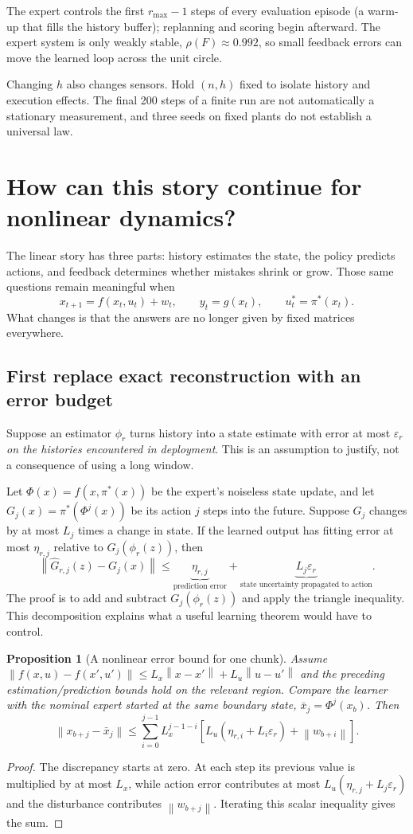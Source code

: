 \documentclass[12 pt]{article}        	%
\newtheorem{proposition}[theorem]{Proposition}
\theoremstyle{definition}
\newcommand{\norm}[1]{\left\|#1\right\|}
\begin{document}
The expert controls the first $r_{\max}-1$ steps of every evaluation episode (a warm-up that fills the history buffer); replanning and scoring begin afterward. The expert system is only weakly stable, $\rho(F)\approx0.992$, so small feedback errors can move the learned loop across the unit circle.

Changing $h$ also changes sensors. Hold $(n,h)$ fixed to isolate history and execution effects. The final 200 steps of a finite run are not automatically a stationary measurement, and three seeds on fixed plants do not establish a universal law.

\section{How can this story continue for nonlinear dynamics?}
The linear story has three parts: history estimates the state, the policy predicts actions, and feedback determines whether mistakes shrink or grow. Those same questions remain meaningful when
\[
x_{t+1}=f(x_t,u_t)+w_t,\qquad y_t=g(x_t),\qquad u_t^*=\pi^*(x_t).
\]
What changes is that the answers are no longer given by fixed matrices everywhere.

\subsection{First replace exact reconstruction with an error budget}
Suppose an estimator $\phi_r$ turns history into a state estimate with error at most $\varepsilon_r$ \emph{on the histories encountered in deployment}. This is an assumption to justify, not a consequence of using a long window.

Let $\Phi(x)=f(x,\pi^*(x))$ be the expert's noiseless state update, and let $G_j(x)=\pi^*(\Phi^j(x))$ be its action $j$ steps into the future. Suppose $G_j$ changes by at most $L_j$ times a change in state. If the learned output has fitting error at most $\eta_{r,j}$ relative to $G_j(\phi_r(z))$, then
\[
\norm{\widehat G_{r,j}(z)-G_j(x)}
\le \underbrace{\eta_{r,j}}_{\text{prediction error}}
+\underbrace{L_j\varepsilon_r}_{\text{state uncertainty propagated to action}}.
\]
The proof is to add and subtract $G_j(\phi_r(z))$ and apply the triangle inequality. This decomposition explains what a useful learning theorem would have to control.

\begin{proposition}[A nonlinear error bound for one chunk]
Assume $\norm{f(x,u)-f(x',u')}\le L_x\norm{x-x'}+L_u\norm{u-u'}$ and the preceding estimation/prediction bounds hold on the relevant region. Compare the learner with the nominal expert started at the same boundary state, $\bar x_j=\Phi^j(x_b)$. Then
\[
\norm{x_{b+j}-\bar x_j}\le
\sum_{i=0}^{j-1}L_x^{j-1-i}
\left[L_u(\eta_{r,i}+L_i\varepsilon_r)+\norm{w_{b+i}}\right].
\]
\end{proposition}
\begin{proof}
The discrepancy starts at zero. At each step its previous value is multiplied by at most $L_x$, while action error contributes at most $L_u(\eta_{r,j}+L_j\varepsilon_r)$ and the disturbance contributes $\norm{w_{b+j}}$. Iterating this scalar inequality gives the sum.
\end{proof}
\end{document}
